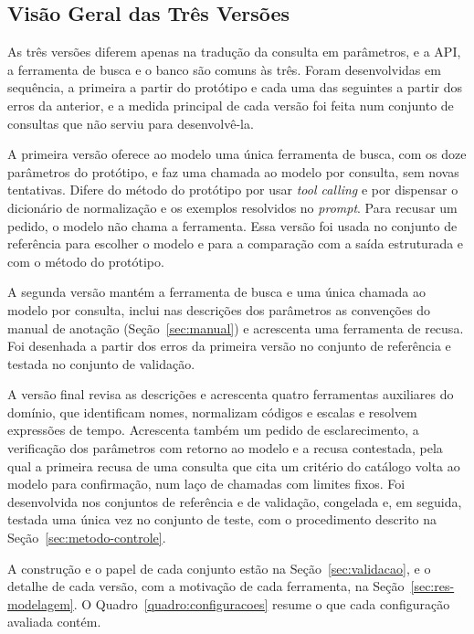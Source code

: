 \subsection{Visão Geral das Três Versões}
\label{sec:visao-versoes}

As três versões diferem apenas na tradução da consulta em parâmetros, e a API, a ferramenta de busca e o banco são comuns às três. Foram desenvolvidas em sequência, a primeira a partir do protótipo e cada uma das seguintes a partir dos erros da anterior, e a medida principal de cada versão foi feita num conjunto de consultas que não serviu para desenvolvê-la.

A primeira versão oferece ao modelo uma única ferramenta de busca, com os doze parâmetros do protótipo, e faz uma chamada ao modelo por consulta, sem novas tentativas. Difere do método do protótipo por usar \textit{tool calling} e por dispensar o dicionário de normalização e os exemplos resolvidos no \textit{prompt}. Para recusar um pedido, o modelo não chama a ferramenta. Essa versão foi usada no conjunto de referência para escolher o modelo e para a comparação com a saída estruturada e com o método do protótipo.

A segunda versão mantém a ferramenta de busca e uma única chamada ao modelo por consulta, inclui nas descrições dos parâmetros as convenções do manual de anotação (Seção~\ref{sec:manual}) e acrescenta uma ferramenta de recusa. Foi desenhada a partir dos erros da primeira versão no conjunto de referência e testada no conjunto de validação.

A versão final revisa as descrições e acrescenta quatro ferramentas auxiliares do domínio, que identificam nomes, normalizam códigos e escalas e resolvem expressões de tempo. Acrescenta também um pedido de esclarecimento, a verificação dos parâmetros com retorno ao modelo e a recusa contestada, pela qual a primeira recusa de uma consulta que cita um critério do catálogo volta ao modelo para confirmação, num laço de chamadas com limites fixos. Foi desenvolvida nos conjuntos de referência e de validação, congelada e, em seguida, testada uma única vez no conjunto de teste, com o procedimento descrito na Seção~\ref{sec:metodo-controle}.

A construção e o papel de cada conjunto estão na Seção~\ref{sec:validacao}, e o detalhe de cada versão, com a motivação de cada ferramenta, na Seção~\ref{sec:res-modelagem}. O Quadro~\ref{quadro:configuracoes} resume o que cada configuração avaliada contém.

